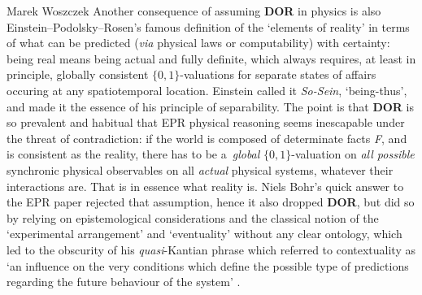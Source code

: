 \begin{artengenv}{Marek Woszczek}
Another consequence of assuming \textbf{DOR} in physics is also Einstein–Podolsky–Rosen's
\parencite*[][]{bohr_can_1935} %
 famous definition of the ‘elements of reality' in terms of what can be predicted (\textit{via} physical laws or computability) with certainty: being real means being actual and fully definite, which always requires, at least in principle, globally consistent $\{0, 1\}$-valuations for separate states of affairs occuring at any spatiotemporal location. Einstein called it \textit{So-Sein}, ‘being-thus', and made it the essence of his principle of separability. The point is that \textbf{DOR} is so prevalent and habitual that EPR physical reasoning seems inescapable under the threat of contradiction: if the world is composed of determinate facts \textit{F}, and is consistent as the reality, there has to be a~\textit{global} $\{0, 1\}$-valuation on \textit{all possible} synchronic physical observables on all \textit{actual} physical systems, whatever their interactions are. That is in essence what reality is. Niels Bohr's quick answer to the EPR paper 
\parencite[][]{bohr_can_1935} %
 rejected that assumption, hence it also dropped \textbf{DOR}, but did so by relying on epistemological considerations and the classical notion of the ‘experimental arrangement' and ‘eventuality' without any clear ontology, which led to the obscurity of his \textit{quasi}-Kantian phrase which referred to contextuality as ‘an influence on the very conditions which define the possible type of predictions regarding the future behaviour of the system'
\parencite[][p.700]{bohr_can_1935}.%



\end{artengenv}
